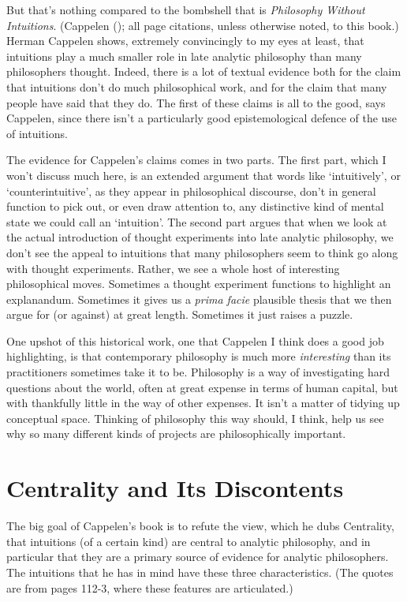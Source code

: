 \documentclass[
  10pt,
  letterpaper,
  DIV=11,
  numbers=noendperiod,
  twoside]{scrartcl}
\begin{document}
But that's nothing compared to the bombshell that is \emph{Philosophy
Without Intuitions}. (Cappelen (); all
page citations, unless otherwise noted, to this book.) Herman Cappelen
shows, extremely convincingly to my eyes at least, that intuitions play
a much smaller role in late analytic philosophy than many philosophers
thought. Indeed, there is a lot of textual evidence both for the claim
that intuitions don't do much philosophical work, and for the claim that
many people have said that they do. The first of these claims is all to
the good, says Cappelen, since there isn't a particularly good
epistemological defence of the use of intuitions.

The evidence for Cappelen's claims comes in two parts. The first part,
which I won't discuss much here, is an extended argument that words like
`intuitively', or `counterintuitive', as they appear in philosophical
discourse, don't in general function to pick out, or even draw attention
to, any distinctive kind of mental state we could call an `intuition'.
The second part argues that when we look at the actual introduction of
thought experiments into late analytic philosophy, we don't see the
appeal to intuitions that many philosophers seem to think go along with
thought experiments. Rather, we see a whole host of interesting
philosophical moves. Sometimes a thought experiment functions to
highlight an explanandum. Sometimes it gives us a \emph{prima facie}
plausible thesis that we then argue for (or against) at great length.
Sometimes it just raises a puzzle.

One upshot of this historical work, one that Cappelen I think does a
good job highlighting, is that contemporary philosophy is much more
\emph{interesting} than its practitioners sometimes take it to be.
Philosophy is a way of investigating hard questions about the world,
often at great expense in terms of human capital, but with thankfully
little in the way of other expenses. It isn't a matter of tidying up
conceptual space. Thinking of philosophy this way should, I think, help
us see why so many different kinds of projects are philosophically
important.

\section{Centrality and Its Discontents}\label{sec-Centrality}

The big goal of Cappelen's book is to refute the view, which he dubs
Centrality, that intuitions (of a certain kind) are central to analytic
philosophy, and in particular that they are a primary source of evidence
for analytic philosophers. The intuitions that he has in mind have these
three characteristics. (The quotes are from pages 112-3, where these
features are articulated.)
\end{document}
